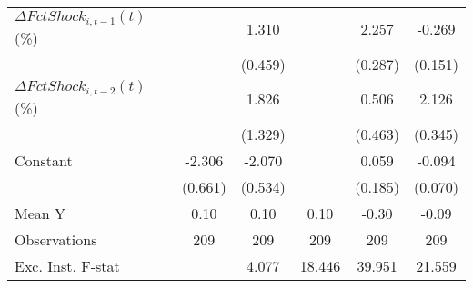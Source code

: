 {\begin{tabular}{l*{5}{c}}
\addlinespace
$ \Delta FctShock_{i,t-1}(t)$ (\%)&                     &       1.310\sym{**} &                     &       2.257\sym{***}&      -0.269         \\
                    &                     &     (0.459)         &                     &     (0.287)         &     (0.151)         \\
\addlinespace
$ \Delta FctShock_{i,t-2}(t)$ (\%)&                     &       1.826         &                     &       0.506         &       2.126\sym{***}\\
                    &                     &     (1.329)         &                     &     (0.463)         &     (0.345)         \\
\addlinespace
Constant            &      -2.306\sym{***}&      -2.070\sym{***}&                     &       0.059         &      -0.094         \\
                    &     (0.661)         &     (0.534)         &                     &     (0.185)         &     (0.070)         \\
\midrule
Mean Y              &        0.10         &        0.10         &        0.10         &       -0.30         &       -0.09         \\
Observations        &         209         &         209         &         209         &         209         &         209         \\
Exc. Inst. F-stat   &                     &       4.077         &      18.446         &      39.951         &      21.559         \\
\bottomrule
\end{tabular}
}
